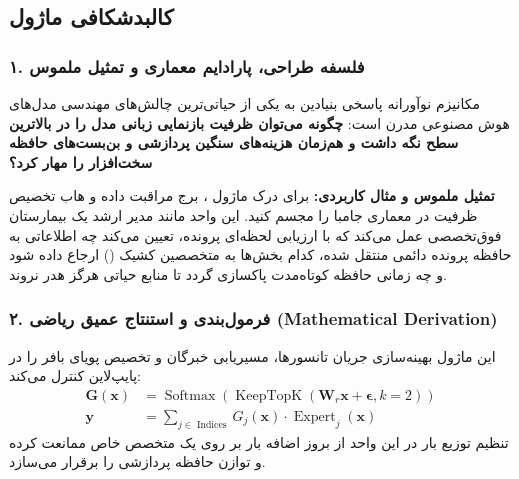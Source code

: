 \subsection{کالبدشکافی ماژول }

\subsubsection*{۱. فلسفه طراحی، پارادایم معماری و تمثیل ملموس}
مکانیزم نوآورانه  پاسخی بنیادین به یکی از حیاتی‌ترین چالش‌های مهندسی مدل‌های هوش مصنوعی مدرن است: \textbf{چگونه می‌توان ظرفیت بازنمایی زبانی مدل را در بالاترین سطح نگه داشت و هم‌زمان هزینه‌های سنگین پردازشی و بن‌بست‌های حافظه سخت‌افزار را مهار کرد؟}

\textbf{تمثیل ملموس و مثال کاربردی:}
برای درک ماژول ، برج مراقبت داده و هاب تخصیص ظرفیت در معماری جامبا را مجسم کنید. این واحد مانند مدیر ارشد یک بیمارستان فوق‌تخصصی عمل می‌کند که با ارزیابی لحظه‌ای پرونده، تعیین می‌کند چه اطلاعاتی به حافظه پرونده دائمی منتقل شده، کدام بخش‌ها به متخصصین کشیک () ارجاع داده شود و چه زمانی حافظه کوتاه‌مدت پاکسازی گردد تا منابع حیاتی هرگز هدر نروند.

\subsubsection*{۲. فرمول‌بندی و استنتاج عمیق ریاضی (Mathematical Derivation)}
این ماژول بهینه‌سازی جریان تانسورها، مسیریابی خبرگان و تخصیص پویای بافر را در پایپ‌لاین کنترل می‌کند:
\begin{align}
\mathbf{G}(\mathbf{x}) &= \operatorname{Softmax}\left(\operatorname{KeepTopK}(\mathbf{W}_r \mathbf{x} + \boldsymbol{\epsilon}, k=2)\right) \\
\mathbf{y} &= \sum_{j \in \operatorname{Indices}} G_j(\mathbf{x}) \cdot \operatorname{Expert}_j(\mathbf{x})
\end{align}
تنظیم توزیع بار در این واحد از بروز اضافه بار بر روی یک متخصص خاص ممانعت کرده و توازن حافظه پردازشی را برقرار می‌سازد.

